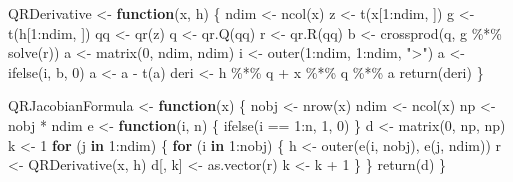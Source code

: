 \documentclass[
  12pt,
  letterpaper,
  DIV=11,
  numbers=noendperiod]{scrartcl}
\newenvironment{Shaded}{\begin{snugshade}}{\end{snugshade}}
\newcommand{\ControlFlowTok}[1]{\textcolor[rgb]{0.00,0.23,0.31}{\textbf{#1}}}
\newcommand{\DecValTok}[1]{\textcolor[rgb]{0.68,0.00,0.00}{#1}}
\newcommand{\FunctionTok}[1]{\textcolor[rgb]{0.28,0.35,0.67}{#1}}
\newcommand{\NormalTok}[1]{\textcolor[rgb]{0.00,0.23,0.31}{#1}}
\newcommand{\OtherTok}[1]{\textcolor[rgb]{0.00,0.23,0.31}{#1}}
\newcommand{\SpecialCharTok}[1]{\textcolor[rgb]{0.37,0.37,0.37}{#1}}
\newcommand{\StringTok}[1]{\textcolor[rgb]{0.13,0.47,0.30}{#1}}
\begin{document}
\begin{Shaded}
\begin{Highlighting}[]
\NormalTok{QRDerivative }\OtherTok{\textless{}{-}} \ControlFlowTok{function}\NormalTok{(x, h) \{}
\NormalTok{  ndim }\OtherTok{\textless{}{-}} \FunctionTok{ncol}\NormalTok{(x)}
\NormalTok{  z }\OtherTok{\textless{}{-}} \FunctionTok{t}\NormalTok{(x[}\DecValTok{1}\SpecialCharTok{:}\NormalTok{ndim, ])}
\NormalTok{  g }\OtherTok{\textless{}{-}} \FunctionTok{t}\NormalTok{(h[}\DecValTok{1}\SpecialCharTok{:}\NormalTok{ndim, ])}
\NormalTok{  qq }\OtherTok{\textless{}{-}} \FunctionTok{qr}\NormalTok{(z)}
\NormalTok{  q }\OtherTok{\textless{}{-}} \FunctionTok{qr.Q}\NormalTok{(qq)}
\NormalTok{  r }\OtherTok{\textless{}{-}} \FunctionTok{qr.R}\NormalTok{(qq)}
\NormalTok{  b }\OtherTok{\textless{}{-}} \FunctionTok{crossprod}\NormalTok{(q, g }\SpecialCharTok{\%*\%} \FunctionTok{solve}\NormalTok{(r))}
\NormalTok{  a }\OtherTok{\textless{}{-}} \FunctionTok{matrix}\NormalTok{(}\DecValTok{0}\NormalTok{, ndim, ndim)}
\NormalTok{  i }\OtherTok{\textless{}{-}} \FunctionTok{outer}\NormalTok{(}\DecValTok{1}\SpecialCharTok{:}\NormalTok{ndim, }\DecValTok{1}\SpecialCharTok{:}\NormalTok{ndim, }\StringTok{"\textgreater{}"}\NormalTok{)}
\NormalTok{  a }\OtherTok{\textless{}{-}} \FunctionTok{ifelse}\NormalTok{(i, b, }\DecValTok{0}\NormalTok{)}
\NormalTok{  a }\OtherTok{\textless{}{-}}\NormalTok{ a }\SpecialCharTok{{-}} \FunctionTok{t}\NormalTok{(a)}
\NormalTok{  deri }\OtherTok{\textless{}{-}}\NormalTok{ h }\SpecialCharTok{\%*\%}\NormalTok{ q }\SpecialCharTok{+}\NormalTok{ x }\SpecialCharTok{\%*\%}\NormalTok{ q }\SpecialCharTok{\%*\%}\NormalTok{ a}
  \FunctionTok{return}\NormalTok{(deri)}
\NormalTok{\}}

\NormalTok{QRJacobianFormula }\OtherTok{\textless{}{-}} \ControlFlowTok{function}\NormalTok{(x) \{}
\NormalTok{  nobj }\OtherTok{\textless{}{-}} \FunctionTok{nrow}\NormalTok{(x)}
\NormalTok{  ndim }\OtherTok{\textless{}{-}} \FunctionTok{ncol}\NormalTok{(x)}
\NormalTok{  np }\OtherTok{\textless{}{-}}\NormalTok{ nobj }\SpecialCharTok{*}\NormalTok{ ndim}
\NormalTok{  e }\OtherTok{\textless{}{-}} \ControlFlowTok{function}\NormalTok{(i, n) \{}
    \FunctionTok{ifelse}\NormalTok{(i }\SpecialCharTok{==} \DecValTok{1}\SpecialCharTok{:}\NormalTok{n, }\DecValTok{1}\NormalTok{, }\DecValTok{0}\NormalTok{)}
\NormalTok{  \}}
\NormalTok{  d }\OtherTok{\textless{}{-}} \FunctionTok{matrix}\NormalTok{(}\DecValTok{0}\NormalTok{, np, np)}
\NormalTok{  k }\OtherTok{\textless{}{-}} \DecValTok{1}
  \ControlFlowTok{for}\NormalTok{ (j }\ControlFlowTok{in} \DecValTok{1}\SpecialCharTok{:}\NormalTok{ndim) \{}
    \ControlFlowTok{for}\NormalTok{ (i }\ControlFlowTok{in} \DecValTok{1}\SpecialCharTok{:}\NormalTok{nobj) \{}
\NormalTok{      h }\OtherTok{\textless{}{-}} \FunctionTok{outer}\NormalTok{(}\FunctionTok{e}\NormalTok{(i, nobj), }\FunctionTok{e}\NormalTok{(j, ndim))}
\NormalTok{      r }\OtherTok{\textless{}{-}} \FunctionTok{QRDerivative}\NormalTok{(x, h)}
\NormalTok{      d[, k] }\OtherTok{\textless{}{-}} \FunctionTok{as.vector}\NormalTok{(r)}
\NormalTok{      k }\OtherTok{\textless{}{-}}\NormalTok{ k }\SpecialCharTok{+} \DecValTok{1}
\NormalTok{    \}}
\NormalTok{  \}}
  \FunctionTok{return}\NormalTok{(d)}
\NormalTok{\}}


\end{Highlighting}
\end{Shaded}
\end{document}
